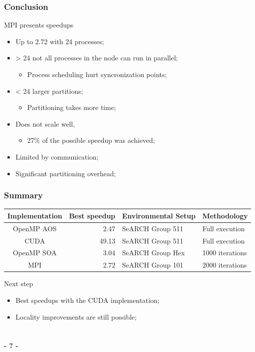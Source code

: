 \documentclass{beamer}
\begin{document}
\begin{frame}
	\frametitle{Conclusion}
	\begin{block}{MPI presents speedups}
		\begin{itemize}
			\item{Up to 2.72 with 24 processes;}
			\item{> 24 not all processes in the node can run in parallel;
			\begin{itemize}
				\item{Process scheduling hurt syncronization points;}
			\end{itemize}
			}
			\item{< 24 larger partitions;
			\begin{itemize}
				\item{Partitioning takes more time;}
			\end{itemize}
			}
			\item{Does not scale well,
			\begin{itemize}
				\item{27\% of the possible speedup was achieved;}
			\end{itemize}
			}
			\item{Limited by communication;}
			\item{Significant partitioning overhead;}
		\end{itemize}
	\end{block}
\end{frame}

\begin{frame}
	\frametitle{Summary}
	\begin{table}
		\smaller
		\begin{center}
			\begin{tabular}{c r ll}
			\hline
			\textbf{Implementation} & \textbf{Best speedup} & \textbf{Environmental Setup} & \textbf{Methodology}	\\
			\hline
			OpenMP AOS & 2.47 & SeARCH Group 511 & Full execution	\\
			CUDA & 49.13 & SeARCH Group 511 & Full execution	\\
			OpenMP SOA & 3.04 & SeARCH Group Hex & 1000 iterations	\\
			MPI & 2.72 & SeARCH Group 101 & 2000 iterations	\\
			\hline
			\end{tabular}
		\end{center}
	\end{table}
	\begin{block}{Next step}
		\begin{itemize}
			\item{Best speedups with the CUDA implementation;}
			\item{Locality improvements are still possible;}
		\end{itemize}
	\end{block}
\end{frame}

\section{} %

\begin{frame}[plain]
	\titlepage
	\begin{center}
		\Huge\bfseries - ? -
	\end{center}
\end{frame}
\end{document}
